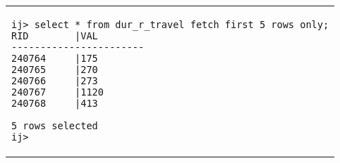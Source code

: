 \begin{tabular}{p{}}
\begin{verbatim}
ij> select * from dur_r_travel fetch first 5 rows only;
RID        |VAL
-----------------------
240764     |175
240765     |270
240766     |273
240767     |1120
240768     |413

5 rows selected
ij>
\end{verbatim}\\
\end{tabular}
